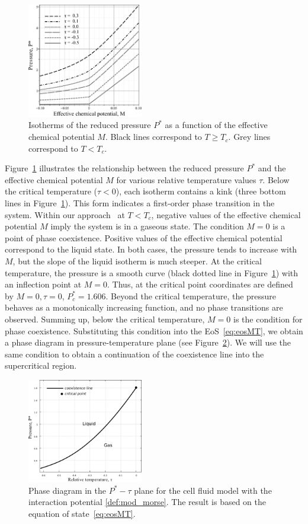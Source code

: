 \begin{figure}[t!]
	\centering
	\includegraphics[width=0.45\textwidth]{f1.pdf} 
	\vskip-3mm\caption{Isotherms of the reduced pressure $P^*$ as a function of the effective chemical potential $M$. Black lines correspond to $T \geq T_c$. Grey lines correspond to $T < T_c$. 
	}\label{fig1}
\end{figure}
Figure~\ref{fig1} illustrates the relationship between the reduced pressure $P^*$ and the effective chemical potential $M$ for various relative temperature values $\tau$. Below the critical temperature ($\tau < 0$), each іsotherm contains a kink (three bottom lines in Figure~\ref{fig1}). This form indicates a first-order phase transition in the system. Within our approach~\cite{KD20} at $T<T_c$, negative values of the effective chemical potential $M$ imply the system is in a gaseous state. The condition $M=0$ is a point of phase coexistence. Positive values of the effective chemical potential correspond to the liquid state. In both cases, the pressure tends to increase with $M$, but the slope of the liquid isotherm is much steeper. At the critical temperature, the pressure is a smooth curve (black dotted line in Figure~\ref{fig1}) with an inflection point at $M=0$. Thus, at the critical point coordinates are defined by $M=0, \tau=0$, $P^*_c = 1.606$. Beyond the critical temperature, the pressure behaves as a monotonically increasing function, and no phase transitions are observed. Summing up, below the critical temperature, $M=0$ is the condition for phase coexistence. Substituting this condition into the EoS~\eqref{eq:eosMT}, we obtain a phase diagram in pressure-temperature plane (see Figure~\ref{fig2}). We will use the same condition to obtain a continuation of the coexistence line into the supercritical region. 
\begin{figure}[t!]
	\centering
	\includegraphics[width=0.45\textwidth]{f2.pdf} 
	\vskip-3mm\caption{Phase diagram in the $P^*-\tau$ plane for the cell fluid model with the interaction potential \eqref{def:mod_morse}. The result is based on the equation of state~\eqref{eq:eosMT}. 
	}\label{fig2}
\end{figure}
